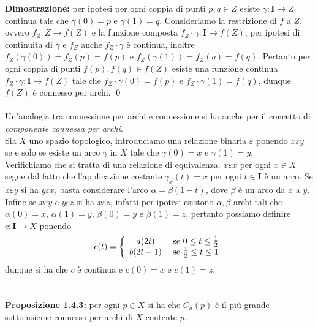 \documentclass{article}
\begin{document}
\textbf{Dimostrazione:} per ipotesi per ogni coppia di punti $p, q \in Z$ esiste $\gamma : \mathbf{I} \longrightarrow Z$ continua tale che $\gamma(0) = p$ e $\gamma(1) = q$. Consideriamo la restrizione di $f$ a $Z$, ovvero $f_Z : Z \longrightarrow f(Z)$ e la funzione composta $f_Z \cdot \gamma : \mathbf{I} \longrightarrow f(Z)$, per ipotesi di continuità di $\gamma$ e $f_Z$ anche $f_Z \cdot \gamma$ è continua, inoltre $f_Z(\gamma(0)) = f_Z(p) = f(p)$ e $f_Z(\gamma(1)) = f_Z(q) = f(q)$. Pertanto per ogni coppia di punti $f(p), f(q) \in f(Z)$ esiste una funzione continua $f_Z \cdot \gamma : \mathbf{I} \longrightarrow f(Z)$ tale che $f_Z \cdot \gamma (0) = f(p)$ e $f_Z \cdot \gamma (1) = f(q)$, dunque $f(Z)$ è connesso per archi. \qed \\ \\
Un'analogia tra connessione per archi e connessione si ha anche per il concetto di \textit{componente connessa per archi}. \\
Sia $X$ uno spazio topologico, introduciamo una relazione binaria $\varepsilon$ ponendo $x \varepsilon y$ se e solo se esiste un arco $\gamma$ in $X$ tale che $\gamma(0) = x$ e $\gamma (1) = y$. \\
Verifichiamo che si tratta di una relazione di equivalenza. $x \varepsilon x$ per ogni $x \in X$ segue dal fatto che l'applicazione costante $\gamma_x(t) = x$ per ogni $t \in \mathbf{I}$ è un arco. Se $x \varepsilon y$ si ha $y \varepsilon x$, basta considerare l'arco $\alpha = \beta (1 - t)$, dove $\beta$ è un arco da $x$ a $y$. Infine se $x \varepsilon y$ e $y \varepsilon z$ si ha $x \varepsilon z$, infatti per ipotesi esistono $\alpha, \beta$ archi tali che $\alpha(0) = x$, $\alpha(1) = y$, $\beta(0) = y$ e $\beta(1) = z$, pertanto possiamo definire $c : \mathbf{I} \longrightarrow X$ ponendo
\begin{gather}
    c(t) = \left\{ \begin{array}{cc}
         a(2t)& \text{ se } 0 \leq t \leq \frac{1}{2}  \\
         b(2t - 1)& \text{ se } \frac{1}{2} \leq t \leq 1 \notag
    \end{array} \right.
\end{gather}
dunque si ha che $c$ è continua e $c(0) = x$ e $c(1) = z$.\\ \\ \\
\textbf{Proposizione 1.4.3:} per ogni $p \in X$ si ha che $C_a(p)$ è il più grande sottoinsieme connesso per archi di $X$ contente $p$. \\
\end{document}
